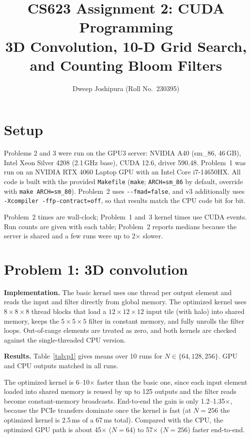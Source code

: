 \documentclass[11pt,a4paper]{article}
\title{CS623 Assignment 2: CUDA Programming\\[2pt]\large 3D Convolution, 10-D Grid Search, and Counting Bloom Filters}
\author{Dweep Joshipura (Roll No.\ 230395)}
\date{}
\begin{document}
\maketitle

\section{Setup}
Problems 2 and 3 were run on the GPU3 server: NVIDIA A40 (sm\_86, 46\,GB), Intel Xeon Silver 4208 (2.1\,GHz base), CUDA 12.6, driver 590.48.
Problem~1 was run on an NVIDIA RTX 4060 Laptop GPU with an Intel Core i7-14650HX.
All code is built with the provided \texttt{Makefile} (\texttt{make}; \texttt{ARCH=sm\_86} by default, override with \texttt{make ARCH=sm\_80}).
Problem~2 uses \texttt{-{}-fmad=false}, and v3 additionally uses \texttt{-Xcompiler -ffp-contract=off}, so that results match the CPU code bit for bit.

Problem~2 times are wall-clock; Problem~1 and~3 kernel times use CUDA events. Run counts are given with each table; Problem~2 reports medians because the server is shared and a few runs were up to 2$\times$ slower.

\section{Problem 1: 3D convolution}
\textbf{Implementation.}
The basic kernel uses one thread per output element and reads the input and filter directly from global memory.
The optimized kernel uses $8{\times}8{\times}8$ thread blocks that load a $12{\times}12{\times}12$ input tile (with halo) into shared memory, keeps the $5{\times}5{\times}5$ filter in constant memory, and fully unrolls the filter loops.
Out-of-range elements are treated as zero, and both kernels are checked against the single-threaded CPU version.

\textbf{Results.}
Table~\ref{tab:p1} gives means over 10 runs for $N\in\{64,128,256\}$. GPU and CPU outputs matched in all runs.

\begin{table}[h]
\centering\small
\resizebox{\linewidth}{!}{}
\caption{Problem 1: mean times over 10 runs. End-to-end includes host--device copies.}
\label{tab:p1}
\end{table}

The optimized kernel is 6--10$\times$ faster than the basic one, since each input element loaded into shared memory is reused by up to 125 outputs and the filter reads become constant-memory broadcasts.
End-to-end the gain is only 1.2--1.35$\times$, because the PCIe transfers dominate once the kernel is fast (at $N=256$ the optimized kernel is 2.5\,ms of a 67\,ms total).
Compared with the CPU, the optimized GPU path is about 45$\times$ ($N=64$) to 57$\times$ ($N=256$) faster end-to-end.
\end{document}
